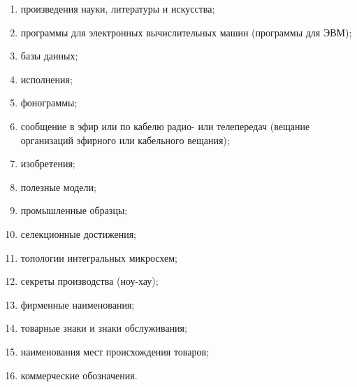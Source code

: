 \begin{enumerate}
\item произведения науки, литературы и искусства;
\item программы для электронных вычислительных машин (программы для ЭВМ);
\item базы данных;
\item исполнения;
\item фонограммы;
\item сообщение в эфир или по кабелю радио- или телепередач (вещание организаций эфирного или кабельного вещания);
\item изобретения;
\item полезные модели;
\item промышленные образцы;
\item селекционные достижения;
\item топологии интегральных микросхем;
\item секреты производства (ноу-хау);
\item фирменные наименования;
\item товарные знаки и знаки обслуживания;
\item наименования мест происхождения товаров;
\item коммерческие обозначения.
\end{enumerate}
